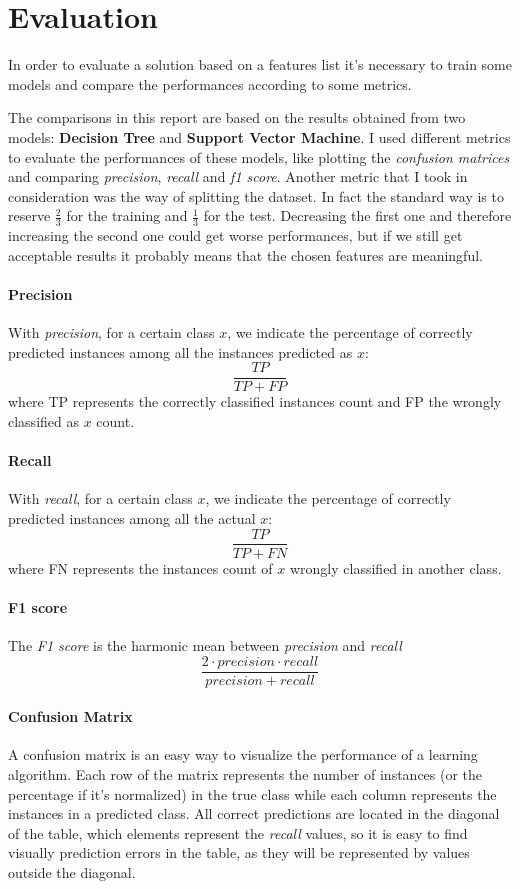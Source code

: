 \documentclass[11pt]{article}
\begin{document}
	\section{Evaluation}
	In order to evaluate a solution based on a features list it's necessary to
	train some models and compare the performances according to some metrics.

	The comparisons in this report are based on the results obtained from two
	models: \textbf{Decision Tree} and \textbf{Support Vector Machine}.
	I used different metrics to evaluate the performances of these models, like
	plotting the \textit{confusion matrices} and comparing \textit{precision},
	\textit{recall} and \textit{f1 score}.
	Another metric that I took in consideration was the way of splitting the dataset.
	In fact the standard way is to reserve $\frac{2}{3}$ for the training
	and $\frac{1}{3}$ for the test. Decreasing the first one and therefore
	increasing the second one could get worse performances, but if we still
	get acceptable results it probably means that the chosen features are meaningful.

	\paragraph{Precision}
	With \textit{precision}, for a certain class $x$, we indicate the percentage of correctly
	predicted instances among all the instances predicted as $x$:
	\[
		\frac{TP}{TP + FP}
	\]
	where TP represents the correctly classified instances count and FP the wrongly
	classified as $x$ count.

	\paragraph{Recall}
	With \textit{recall}, for a certain class $x$, we indicate the percentage of correctly
	predicted instances among all the actual $x$:
	\[
		\frac{TP}{TP + FN}
	\]
	where FN represents the instances count of $x$ wrongly classified in another class.

	\paragraph{F1 score}
	The \textit{F1 score} is the harmonic mean between \textit{precision} and \textit{recall}
	\[
		\frac{2 \cdot precision \cdot recall}{precision + recall}
	\]

	\paragraph{Confusion Matrix}
	A confusion matrix is an easy way to visualize the performance of a learning algorithm. 
	Each row of the matrix represents the number of instances (or the percentage
	if it's normalized) in the true class while each column represents the instances in
	a predicted class.
	All correct predictions are located in the diagonal of the table, which elements
	represent the \textit{recall} values, so it is easy to find visually prediction errors
	in the table, as they will be represented by values outside the diagonal.
\end{document}
